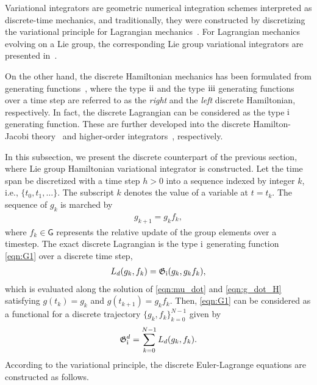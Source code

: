 \documentclass[letterpaper, 10pt, conference]{ieeeconf}
\newcommand{\G}{\ensuremath{\mathsf{G}}}
\newcommand{\RomanNumeralCaps}[1]{\textup{\uppercase\expandafter{\romannumeral#1}}}
\newcommand{\RI}{\RomanNumeralCaps{1}}
\newcommand{\RII}{\RomanNumeralCaps{2}}
\newcommand{\RIII}{\RomanNumeralCaps{3}}
\begin{document}
Variational integrators are geometric numerical integration schemes interpreted as discrete-time mechanics, and traditionally, they were constructed by discretizing the variational principle for Lagrangian mechanics~\cite{MarWesAN01}.
For Lagrangian mechanics evolving on a Lie group, the corresponding Lie group variational integrators are presented in~\cite{Leo04,Lee08,LeeLeoCMAME07}.

On the other hand, the discrete Hamiltonian mechanics has been formulated from generating functions~\cite{de2007discrete,LalWesJPMG06}, where the type $\RII$  and the type $\RIII$ generating functions over a time step are referred to as the \textit{right} and the \textit{left} discrete Hamiltonian, respectively. 
In fact, the discrete Lagrangian can be considered as the type $\RI$ generating function.
These are further developed into the discrete Hamilton-Jacobi theory~\cite{OhsBloSJCO11} and higher-order integrators~\cite{leok2011discrete}, respectively.

In this subsection, we present the discrete counterpart of the previous section, where Lie group Hamiltonian variational integrator is constructed. 
Let the time span be discretized with a time step $h>0$ into a sequence indexed by integer $k$, i.e., $\{t_0,t_1,\ldots\}$.
The subscript $k$ denotes the value of a variable at $t=t_k$.
The sequence of $g_k$ is marched by
\begin{align}
    g_{k+1} = g_k f_k,\label{eqn:gkp}
\end{align}
where $f_k\in\G$ represents the relative update of the group elements over a timestep. 
The exact discrete Lagrangian is the type $\RI$ generating function \eqref{eqn:G1} over a discrete time step,
\begin{align*}
    L_d (g_k, f_k) = \mathfrak{G}_\RI (g_k, g_kf_k),
\end{align*}
which is evaluated along the solution of \eqref{eqn:mu_dot} and \eqref{eqn:g_dot_H} satisfying $g(t_k)=g_k$ and $g(t_{k+1})=g_kf_k$.
Then, \eqref{eqn:G1} can be considered as a functional for a discrete trajectory $\{g_k,f_k\}_{k=0}^{N-1}$ given by
\begin{align}
    \mathfrak{G}^d_\RI = \sum_{k=0}^{N-1} L_d(g_k,f_k).\label{eqn:G1d}
\end{align}
According to the variational principle, the discrete Euler-Lagrange equations are constructed as follows. 
\end{document}
